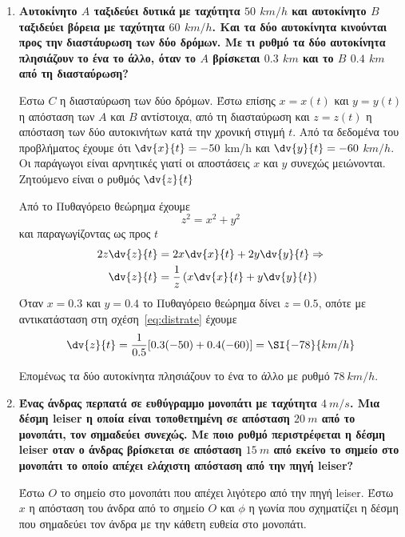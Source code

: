 \begin{enumerate}
\item  {\bfseries \boldmath Αυτοκίνητο $A$ ταξιδεύει δυτικά με ταχύτητα $50$
	$\si{km\per h}$ και αυτοκίνητο $B$ ταξιδεύει βόρεια με ταχύτητα $60$
$\si{km/h}$. Και τα δύο αυτοκίνητα κινούνται προς την διαστάυρωση των δύο δρόμων. Με τι ρυθμό τα δύο αυτοκίνητα πλησιάζουν το ένα το άλλο, όταν το $A$ βρίσκεται $0.3$ $\si{km}$ και το $B$ $0.4$ $\si{km}$ από τη διασταύρωση?}


	\vspace{\baselineskip}

	Εστω $C$ η διασταύρωση των δύο δρόμων. Έστω επίσης $x=x(t)$ και $y=y(t)$ η απόσταση των $A$ και $B$ αντίστοιχα, από τη διασταύρωση  και $z=z(t)$ η απόσταση των δύο αυτοκινήτων κατά την χρονική στιγμή $t$.
	Από τα δεδομένα του προβλήματος έχουμε ότι $\dv{x}{t}=-50$ \si{km/h} και
	$\dv{y}{t}=-60$ $\si{km/h}$. Οι παράγωγοι είναι αρνητικές γιατί οι αποστάσεις $x$ και $y$ συνεχώς μειώνονται. Ζητούμενο είναι ο ρυθμός $\dv{z}{t}$

	Από το Πυθαγόρειο θεώρημα έχουμε
	\[
		z^{2}=x^{2}+y^{2}
	\]
	και παραγωγίζοντας ως προς $t$
	\begin{align} \label{eq:distrate}
2z\dv{z}{t} &= 2x\dv{x}{t} + 2y\dv{y}{t} \notag \Rightarrow \\
\dv{z}{t} &= \frac{1}{z}\left(x\dv{x}{t}+y\dv{y}{t}\right)
\end{align}
Όταν $x=0.3$ και $y=0.4$ το Πυθαγόρειο θεώρημα δίνει $z=0.5$, οπότε με αντικατάσταση στη σχέση~\eqref{eq:distrate} έχουμε
\[
	\dv{z}{t}=\frac{1}{0.5}[0.3(-50)+0.4(-60)] = \SI{-78}{km/h}
\]

Επομένως τα δύο αυτοκίνητα πλησιάζουν το ένα το άλλο με ρυθμό $\SI{78}{km/h}$.



\item {\bfseries \boldmath Ένας άνδρας περπατά σε ευθύγραμμο μονοπάτι με
	ταχύτητα $\SI{4}{m/s}$. Μια δέσμη leiser η οποία είναι τοποθετημένη σε απόσταση $\SI{20}{m}$ από το μονοπάτι, τον σημαδεύει συνεχώς. Με ποιο ρυθμό περιστρέφεται η δέσμη leiser οταν ο άνδρας βρίσκεται σε απόσταση $\SI{15}{m}$ από εκείνο το σημείο στο μονοπάτι το οποίο απέχει ελάχιστη απόσταση από την πηγή leiser?}


	\vspace{\baselineskip}
	Έστω $O$ το σημείο στο μονοπάτι που απέχει λιγότερο από την πηγή leiser.
	Έστω $x$ η απόσταση του άνδρα από το σημείο $O$ και $\phi$ η γωνία που σχηματίζει η δέσμη που σημαδεύει τον άνδρα με την κάθετη ευθεία στο μονοπάτι.


\end{enumerate}
